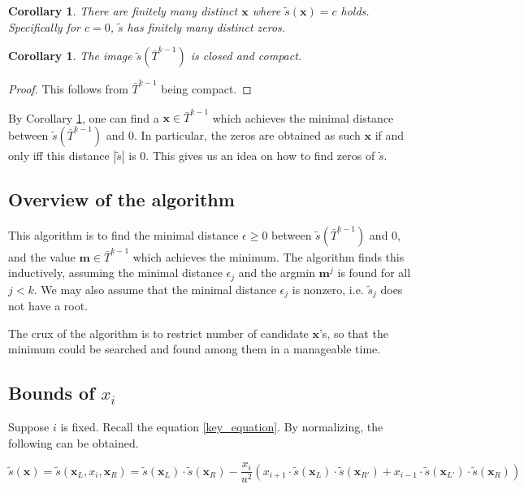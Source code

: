 \documentclass{article}
\theoremstyle{definition}
\theoremstyle{plain}
\newtheorem{corollary}[theorem]{Corollary}
\theoremstyle{remark}
\numberwithin{equation}{section}
\newcommand{\abs}[1]{\left\lvert{#1}\right\rvert}
\begin{document}
\begin{corollary}
  There are finitely many distinct $\mathbf{x}$ where $\tilde{s}(\mathbf{x}) = c$ holds.
  Specifically for $c = 0$, $\tilde{s}$ has finitely many distinct zeros.
\end{corollary}

\begin{corollary}\label{image_compact}
  The image $\tilde{s}(\bar{T}^{k-1})$ is closed and compact.
\end{corollary}
\begin{proof}
  This follows from $\bar{T}^{k-1}$ being compact.
\end{proof}

By Corollary \ref{image_compact}, one can find a $\mathbf{x} \in \bar{T}^{k-1}$
which achieves the minimal distance between $\tilde{s}(\bar{T}^{k-1})$ and $0$.
In particular, the zeros are obtained as such $\mathbf{x}$ if and only iff this distance $\abs{\tilde{s}}$ is $0$.
This gives us an idea on how to find zeros of $\tilde{s}$.

\subsection{Overview of the algorithm}

This algorithm is to find the minimal distance $\epsilon \geq 0$ between $\tilde{s}(\bar{T}^{k-1})$ and $0$,
and the value $\mathbf{m} \in \bar{T}^{k-1}$ which achieves the minimum.
The algorithm finds this inductively,
assuming the minimal distance $\epsilon_j$ and the argmin $\mathbf{m}^j$ is found for all $j < k$.
We may also assume that the minimal distance $\epsilon_j$ is nonzero,
i.e. $\tilde{s}_j$ does not have a root.

The crux of the algorithm is to restrict number of candidate $\mathbf{x}$'s,
so that the minimum could be searched and found among them in a manageable time.

\subsection{Bounds of $x_i$}

\def\xs {\mathbf{x}}
\def\xsL {\mathbf{x}_L}
\def\xsR {\mathbf{x}_R}
\def\xsLl {\mathbf{x}_{L'}}
\def\xsRr {\mathbf{x}_{R'}}

Suppose $i$ is fixed.
Recall the equation \eqref{key_equation}.
By normalizing, the following can be obtained.

\[
  \tilde{s}(\xs) = \tilde{s}(\xsL, x_i, \xsR)
  = \tilde{s}(\xsL) \cdot \tilde{s}(\xsR)
  - \frac{x_i}{u^2}
  (x_{i+1} \cdot \tilde{s}(\xsL) \cdot \tilde{s}(\xsRr) + x_{i-1} \cdot \tilde{s}(\xsLl) \cdot \tilde{s}(\xsR))
\]
\end{document}
